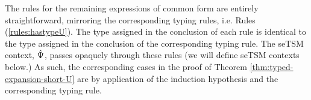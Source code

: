 The rules for the remaining expressions of common form are entirely straightforward, mirroring the corresponding typing rules, i.e. Rules (\ref{rules:hastypeU}). %
The type assigned in the conclusion of each rule is identical to the type assigned in the conclusion of the corresponding typing rule. The seTSM context, $\hat{\Psi}$, passes opaquely through these rules (we will define seTSM contexts below.) As such, the corresponding cases in the proof of Theorem \ref{thm:typed-expansion-short-U} are by application of the induction hypothesis and the  corresponding typing rule. %

